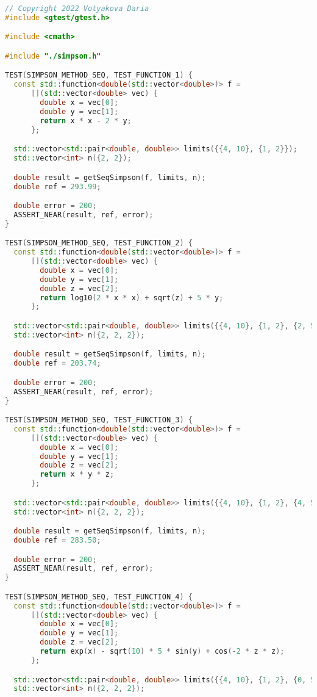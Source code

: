 \documentclass{report}
\begin{document}
\begin{lstlisting}[language=C++]
// Copyright 2022 Votyakova Daria
#include <gtest/gtest.h>

#include <cmath>

#include "./simpson.h"

TEST(SIMPSON_METHOD_SEQ, TEST_FUNCTION_1) {
  const std::function<double(std::vector<double>)> f =
      [](std::vector<double> vec) {
        double x = vec[0];
        double y = vec[1];
        return x * x - 2 * y;
      };

  std::vector<std::pair<double, double>> limits({{4, 10}, {1, 2}});
  std::vector<int> n({2, 2});

  double result = getSeqSimpson(f, limits, n);
  double ref = 293.99;

  double error = 200;
  ASSERT_NEAR(result, ref, error);
}

TEST(SIMPSON_METHOD_SEQ, TEST_FUNCTION_2) {
  const std::function<double(std::vector<double>)> f =
      [](std::vector<double> vec) {
        double x = vec[0];
        double y = vec[1];
        double z = vec[2];
        return log10(2 * x * x) + sqrt(z) + 5 * y;
      };

  std::vector<std::pair<double, double>> limits({{4, 10}, {1, 2}, {2, 5}});
  std::vector<int> n({2, 2, 2});

  double result = getSeqSimpson(f, limits, n);
  double ref = 203.74;

  double error = 200;
  ASSERT_NEAR(result, ref, error);
}

TEST(SIMPSON_METHOD_SEQ, TEST_FUNCTION_3) {
  const std::function<double(std::vector<double>)> f =
      [](std::vector<double> vec) {
        double x = vec[0];
        double y = vec[1];
        double z = vec[2];
        return x * y * z;
      };

  std::vector<std::pair<double, double>> limits({{4, 10}, {1, 2}, {4, 5}});
  std::vector<int> n({2, 2, 2});

  double result = getSeqSimpson(f, limits, n);
  double ref = 283.50;

  double error = 200;
  ASSERT_NEAR(result, ref, error);
}

TEST(SIMPSON_METHOD_SEQ, TEST_FUNCTION_4) {
  const std::function<double(std::vector<double>)> f =
      [](std::vector<double> vec) {
        double x = vec[0];
        double y = vec[1];
        double z = vec[2];
        return exp(x) - sqrt(10) * 5 * sin(y) + cos(-2 * z * z);
      };

  std::vector<std::pair<double, double>> limits({{4, 10}, {1, 2}, {0, 5}});
  std::vector<int> n({2, 2, 2});


\end{lstlisting}
\end{document}
